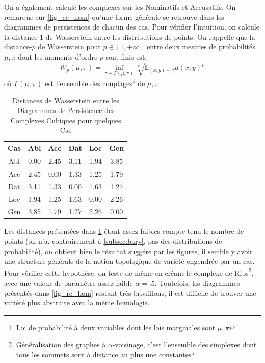 \documentclass{cours}
\begin{document}
On a également calculé les complexes sur les Nominatifs et Accusatifs. On remarque sur \ref{fig_cc_hom} qu'une forme générale se retrouve dans les diagrammes de persistences de chacun des cas.
Pour vérifier l'intuition, on calcule la distance-$1$ de Wasserstein entre les distributions de points. On rappelle que la distance-$p$ de Wasserstein pour $p \in \left[1, +\infty\right]$ entre deux mesures de probabilités $\mu, \pi$ dont les moments d'ordre $p$ sont finis est:
\begin{equation*}
W_{p}(\mu, \pi) = \inf_{\gamma\in\Gamma\left(\mu, \pi\right)}\sqrt[p]{\mathbb{E}_{(x, y) \sim \gamma}d(x, y)^{p}}
\end{equation*}
où $\Gamma\left(\mu, \pi\right)$ est l'ensemble des couplages\footnote{Loi de probabilité à deux variables dont les lois marginales sont $\mu, \pi$} de $\mu, \pi$.

\begin{table}
\centering
\begin{tabular}{c|ccccc}
	\toprule
	Cas & Abl & Acc & Dat & Loc & Gen\\
	\midrule
	Abl & 0.00 & 2.45 & 3.11 & 1.94 & 3.85\\
	Acc & 2.45 & 0.00 & 1.33 & 1.25 & 1.79\\
	Dat & 3.11 & 1.33 & 0.00 & 1.63 & 1.27\\
	Loc & 1.94 & 1.25 & 1.63 & 0.00 & 2.26\\
	Gen & 3.85 & 1.79 & 1.27 & 2.26 & 0.00\\
	\bottomrule
\end{tabular}
\caption{Distances de Wasserstein entre les Diagrammes de Persistence des Complexes Cubiques pour quelques Cas}
\label{tab_wass_cc}
\end{table}

Les distances présentées dans \ref{tab_wass_cc} étant assez faibles compte tenu le nombre de points (on n'a, contrairement à \ref{subsec:bary}, pas des distributions de probabilité), on obtient bien le résultat suggéré par les figures, il semble y avoir une structure générale de la notion topologique de variété engendrée par un cas.
Pour vérifier cette hypothèse, on teste de même en créant le complexe de Rips\footnote{Généralisation des graphes à $\alpha$-voisinage, c'est l'ensemble des simplexes dont tous les sommets sont à distance au plus une constante}, avec une valeur de paramètre assez faible $\alpha = .5$.
Toutefois, les diagrammes présentés dans \ref{fig_rc_hom} restant très brouillons, il est difficile de trouver une variété plus abstraite avec la même homologie.
\end{document}
